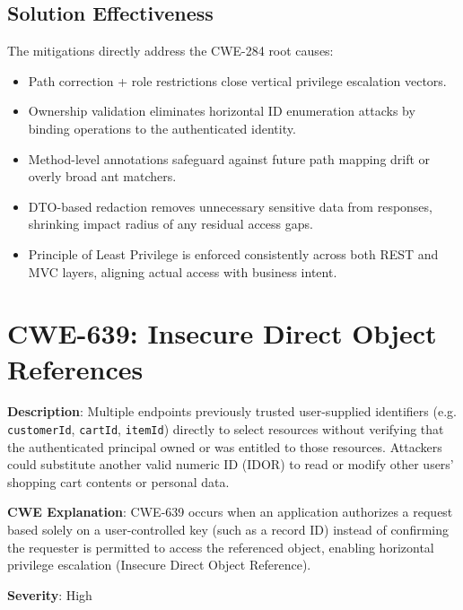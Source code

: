 \documentclass[]{UCD_CS_FYP_Report}
\begin{document}
\subsection*{Solution Effectiveness}
The mitigations directly address the CWE-284 root causes:
\begin{itemize}
	\item Path correction + role restrictions close vertical privilege escalation vectors.
	\item Ownership validation eliminates horizontal ID enumeration attacks by binding operations to the authenticated identity.
	\item Method-level annotations safeguard against future path mapping drift or overly broad ant matchers.
	\item DTO-based redaction removes unnecessary sensitive data from responses, shrinking impact radius of any residual access gaps.
	\item Principle of Least Privilege is enforced consistently across both REST and MVC layers, aligning actual access with business intent.
\end{itemize}



\section{CWE-639: Insecure Direct Object References }

	\textbf{Description}: Multiple endpoints previously trusted user-supplied identifiers (e.g. \texttt{customerId}, \texttt{cartId}, \texttt{itemId}) directly to select resources without verifying that the authenticated principal owned or was entitled to those resources. Attackers could substitute another valid numeric ID (IDOR) to read or modify other users' shopping cart contents or personal data.

	\textbf{CWE Explanation}: CWE-639 occurs when an application authorizes a request based solely on a user-controlled key (such as a record ID) instead of confirming the requester is permitted to access the referenced object, enabling horizontal privilege escalation (Insecure Direct Object Reference).

	\textbf{Severity}: High
\end{document}
